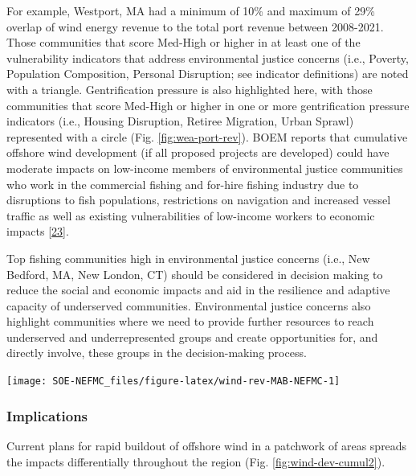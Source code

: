 \documentclass[
  10pt,
]{article}
\let\origfigure\figure
\let\endorigfigure\endfigure
\renewenvironment{figure}[1][2] {
    \expandafter\origfigure\expandafter[H]
} {
    \endorigfigure
}
\begin{document}
For example, Westport, MA had a minimum of 10\% and maximum of 29\% overlap of wind energy revenue to the total port revenue between 2008-2021. Those communities that score Med-High or higher in at least one of the vulnerability indicators that address environmental justice concerns (i.e., Poverty, Population Composition, Personal Disruption; see indicator definitions) are noted with a triangle. Gentrification pressure is also highlighted here, with those communities that score Med-High or higher in one or more gentrification pressure indicators (i.e., Housing Disruption, Retiree Migration, Urban Sprawl) represented with a circle (Fig. \ref{fig:wea-port-rev}). BOEM reports that cumulative offshore wind development (if all proposed projects are developed) could have moderate impacts on low-income members of environmental justice communities who work in the commercial fishing and for-hire fishing industry due to disruptions to fish populations, restrictions on navigation and increased vessel traffic as well as existing vulnerabilities of low-income workers to economic impacts {[}\protect\hyperlink{ref-boem_vineyard_2020}{23}{]}.

Top fishing communities high in environmental justice concerns (i.e., New Bedford, MA, New London, CT) should be considered in decision making to reduce the social and economic impacts and aid in the resilience and adaptive capacity of underserved communities. Environmental justice concerns also highlight communities where we need to provide further resources to reach underserved and underrepresented groups and create opportunities for, and directly involve, these groups in the decision-making process.

\begin{figure}

\texttt{[image: SOE-NEFMC\_files/figure-latex/wind-rev-MAB-NEFMC-1]} \hfill{}

\caption{Percent of Mid-Atlantic port revenue with majority NEFMC landings from Wind Energy Areas (WEA) in descending order from most to least port fisheries revenue from WEA. EJ = Environmental Justice.}\label{fig:wind-rev-MAB-NEFMC}
\end{figure}

\hypertarget{implications-7}{%
\subsubsection{Implications}\label{implications-7}}

Current plans for rapid buildout of offshore wind in a patchwork of areas spreads the impacts differentially throughout the region (Fig. \ref{fig:wind-dev-cumul2}).
\end{document}
